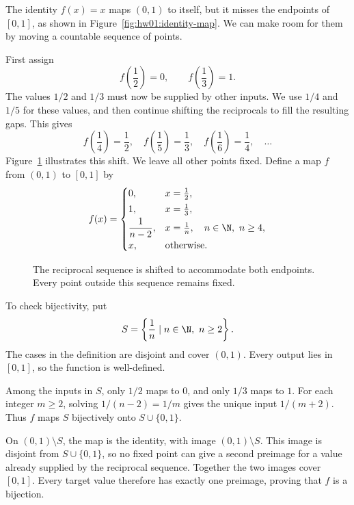 The identity $f(x)=x$ maps $(0,1)$ to itself, but it misses the
endpoints of $[0,1]$, as shown in Figure~\ref{fig:hw01:identity-map}.
We can make room for them by moving a countable sequence of points.

\begin{marginfigure}
  \centering
  
  \caption{The identity on $(0,1)$ misses the target values $0$ and $1$.
    Both endpoints of the graph are excluded.}
  \label{fig:hw01:identity-map}
\end{marginfigure}

First assign
\[
  f\left(\frac12\right)=0,
  \qquad f\left(\frac13\right)=1.
\]
The values $1/2$ and $1/3$ must now be supplied by other inputs.
We use $1/4$ and $1/5$ for these values, and then continue shifting
the reciprocals to fill the resulting gaps. This gives
\[
  f\left(\frac14\right)=\frac12,\quad
  f\left(\frac15\right)=\frac13,\quad
  f\left(\frac16\right)=\frac14,\quad\ldots
\]
Figure~\ref{fig:hw01:reciprocal-shift} illustrates this shift.
We leave all other points fixed. Define a map $f$ from $(0,1)$
to $[0,1]$ by
\[
  f(x)=
  \begin{cases}
    0, & x=\frac12,\\[2pt]
    1, & x=\frac13,\\[2pt]
    \dfrac1{n-2}, & x=\frac1n,\quad n\in\N,\ n\ge4,\\[4pt]
    x, & \text{otherwise}.
  \end{cases}
\]

\begin{figure}[h]
  \centering
  
  \caption{The reciprocal sequence is shifted to accommodate both
    endpoints. Every point outside this sequence remains fixed.}
  \label{fig:hw01:reciprocal-shift}
\end{figure}

To check bijectivity, put
\[
  S=\left\{\frac1n\mid n\in\N,\ n\ge2\right\}.
\]
The cases in the definition are disjoint and cover $(0,1)$.
Every output lies in $[0,1]$, so the function is well-defined.

Among the inputs in $S$, only $1/2$ maps to $0$, and only $1/3$
maps to $1$. For each integer $m\ge2$, solving $1/(n-2)=1/m$
gives the unique input $1/(m+2)$. Thus $f$ maps $S$ bijectively
onto $S\cup\{0,1\}$.

On $(0,1)\setminus S$, the map is the identity, with image
$(0,1)\setminus S$. This image is disjoint from $S\cup\{0,1\}$,
so no fixed point can give a second preimage for a value already
supplied by the reciprocal sequence. Together the two images
cover $[0,1]$. Every target value therefore has exactly one
preimage, proving that $f$ is a bijection.

